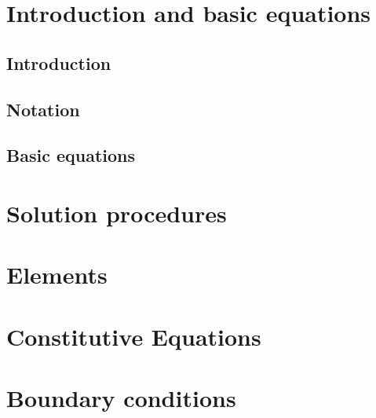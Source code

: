 \documentclass[a4paper]{book}
\begin{document}


\clearpage
\setcounter{page}{1}
\pagestyle{headings}

\tableofcontents
\chapter{Introduction and basic equations}
\section{Introduction}

\section{Notation}
\section{Basic equations}


\chapter{Solution procedures}

\chapter{Elements}
\chapter{Constitutive Equations}
\chapter{Boundary conditions}

{}



\end{document}
